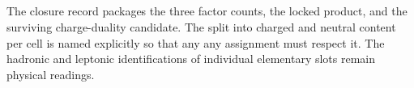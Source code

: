 \documentclass[11pt]{article}
\begin{document}
\begin{code}
\>[0]\AgdaSpace{}%
\AgdaSymbol{=}\<%
\\
\>[0][@{}l@{\AgdaIndent{0}}]%
\>[2]\AgdaSpace{}%
\AgdaOperator{\AgdaPrimitive{*}}\AgdaSpace{}%
\AgdaSpace{}%
\AgdaOperator{\AgdaPrimitive{*}}\AgdaSpace{}%
\<%
\\
%
\\[\AgdaEmptyExtraSkip]%
\>[0]\AgdaSpace{}%
\AgdaSymbol{:}\AgdaSpace{}%
\AgdaSpace{}%
\AgdaSpace{}%
\<%
\\
\>[0]\AgdaSpace{}%
\AgdaSymbol{=}\AgdaSpace{}%
\<%
\\
%
\\[\AgdaEmptyExtraSkip]%
\>[0]\AgdaSpace{}%
\AgdaSymbol{:}\<%
\\
\>[0][@{}l@{\AgdaIndent{0}}]%
\>[2]\<%
\\
\>[2][@{}l@{\AgdaIndent{0}}]%
\>[4]\AgdaSpace{}%
\AgdaSpace{}%
\AgdaOperator{\AgdaPrimitive{*}}\AgdaSpace{}%
\AgdaSpace{}%
\AgdaOperator{\AgdaPrimitive{*}}\AgdaSpace{}%
\<%
\\
\>[0]\AgdaSpace{}%
\AgdaSymbol{=}\AgdaSpace{}%
\<%
\end{code}

The closure record packages the three factor counts, the locked
product, and the surviving charge-duality candidate.  The split into
charged and neutral content per cell is named explicitly so that any
any assignment must respect it.  The hadronic and leptonic
identifications of individual elementary slots remain physical
readings.
\end{document}
